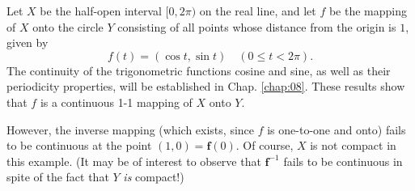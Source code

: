 \begin{newexample}
    Let $X$ be the half-open interval $[0, 2\pi)$ on the real line,
    and let $f$ be the mapping of $X$ onto the circle $Y$ consisting of all points
    whose distance from the origin is $1$, given by
    \begin{equation}
        \label{eq:4.24}
        f(t) = (\cos t, \sin t)
        \quad
        (0 \leq t < 2\pi).
    \end{equation}
    The continuity of the trigonometric functions cosine and sine,
    as well as their periodicity properties, will be established in Chap. \ref{chap:08}.
    These results show that $f$ is a continuous 1-1 mapping of $X$ onto $Y$.

    However, the inverse mapping
    (which exists, since $f$ is one-to-one and onto)
    fails to be continuous at the point $(1, 0) = \mathbf{f}(0)$.
    Of course, $X$ is not compact in this example.
    (It may be of interest to observe that
    $\mathbf{f}^{-1}$ fails to be continuous in spite of the fact that $Y$ \emph{is} compact!)
\end{newexample}